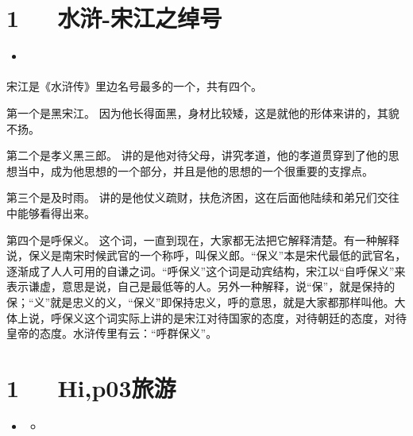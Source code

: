 \documentclass[letterpaper,12pt,english]{sphinxmanual}
\begin{document}
\chapter{1   水浒-宋江之绰号}
\label{\detokenize{p02_u8bfb_u4e66/_u6c34_u6d52-_u5b8b_u6c5f_u4e4b_u7ef0_u53f7:id1}}\label{\detokenize{p02_u8bfb_u4e66/_u6c34_u6d52-_u5b8b_u6c5f_u4e4b_u7ef0_u53f7::doc}}
\begin{sphinxShadowBox}
\begin{itemize}
\item {} 
\label{\detokenize{p02_u8bfb_u4e66/_u6c34_u6d52-_u5b8b_u6c5f_u4e4b_u7ef0_u53f7:id3}}{\hyperref[\detokenize{p02_u8bfb_u4e66/_u6c34_u6d52-_u5b8b_u6c5f_u4e4b_u7ef0_u53f7:id1}]{}}

\end{itemize}
\end{sphinxShadowBox}

宋江是《水浒传》里边名号最多的一个，共有四个。

第一个是黑宋江。
因为他长得面黑，身材比较矮，这是就他的形体来讲的，其貌不扬。

第二个是孝义黑三郎。
讲的是他对待父母，讲究孝道，他的孝道贯穿到了他的思想当中，成为他思想的一个部分，并且是他的思想的一个很重要的支撑点。

第三个是及时雨。
讲的是他仗义疏财，扶危济困，这在后面他陆续和弟兄们交往中能够看得出来。

第四个是呼保义。
这个词，一直到现在，大家都无法把它解释清楚。有一种解释说，保义是南宋时候武官的一个称呼，叫保义郎。“保义”本是宋代最低的武官名，逐渐成了人人可用的自谦之词。“呼保义”这个词是动宾结构，宋江以“自呼保义”来表示谦虚，意思是说，自己是最低等的人。另外一种解释，说“保”，就是保持的保；“义”就是忠义的义，“保义”即保持忠义，呼的意思，就是大家都那样叫他。大体上说，呼保义这个词实际上讲的是宋江对待国家的态度，对待朝廷的态度，对待皇帝的态度。水浒传里有云：“呼群保义”。


\chapter{1   Hi,p03旅游}
\label{\detokenize{p03_u65c5_u6e38/Hello_uff0cp03_u65c5_u6e38:hi-p03}}\label{\detokenize{p03_u65c5_u6e38/Hello_uff0cp03_u65c5_u6e38::doc}}
\begin{sphinxShadowBox}
\begin{itemize}
\item {} 
\label{\detokenize{p03_u65c5_u6e38/Hello_uff0cp03_u65c5_u6e38:id2}}{\hyperref[\detokenize{p03_u65c5_u6e38/Hello_uff0cp03_u65c5_u6e38:hi-p03}]{}}
\begin{itemize}
\item {} 
\label{\detokenize{p03_u65c5_u6e38/Hello_uff0cp03_u65c5_u6e38:id3}}{\hyperref[\detokenize{p03_u65c5_u6e38/Hello_uff0cp03_u65c5_u6e38:post}]{}}

\end{itemize}

\end{itemize}
\end{sphinxShadowBox}
\end{document}

